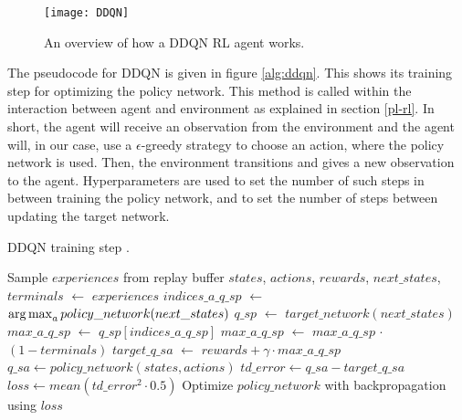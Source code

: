 \begin{figure}[h]
    \centering
    \texttt{[image: DDQN]}
    \caption{An overview of how a DDQN RL agent works.}
    \label{fig:ddqn}
\end{figure}

The pseudocode for DDQN is given in figure \ref{alg:ddqn}. This shows its training step for optimizing the policy network. This method is called within the interaction between agent and environment as explained in section \ref{pl-rl}. In short, the agent will receive an observation from the environment and the agent will, in our case, use a {$\epsilon$}-greedy strategy to choose an action, where the policy network is used. Then, the environment transitions and gives a new observation to the agent. Hyperparameters are used to set the number of such steps in between training the policy network, and to set the number of steps between updating the target network.

\begin{algorithm}
\caption{DDQN training step \cite[p.299]{grokking}.}
\label{alg:ddqn}
\begin{algorithmic}
\State Sample $experiences$ from replay buffer
\State $states$, $actions$, $rewards$, $next\_states$, $terminals$ $\gets$ $experiences$
\State $indices\_a\_q\_sp$ $\gets$ $\operatorname*{arg\,max}_a policy\_ network(next\_states)$
\State $q\_sp$ $\gets$ $target\_network(next\_states)$
\State $max\_a\_q\_sp$ $\gets$ $q\_sp[indices\_a\_q\_sp]$
\State $max\_a\_q\_sp$ $\gets$ $max\_a\_q\_sp$ $\cdot$ $(1-terminals)$ 
\State $target\_q\_sa$ $\gets$ $rewards + \gamma \cdot max\_a\_q\_sp$
\State $q\_sa \gets policy\_network(states, actions)$
\State $td\_error \gets q\_sa - target\_q\_sa$
\State $loss \gets mean(td\_error^2 \cdot 0.5)$
\State Optimize $policy\_network$ with backpropagation using $loss$
\end{algorithmic}
\end{algorithm}

